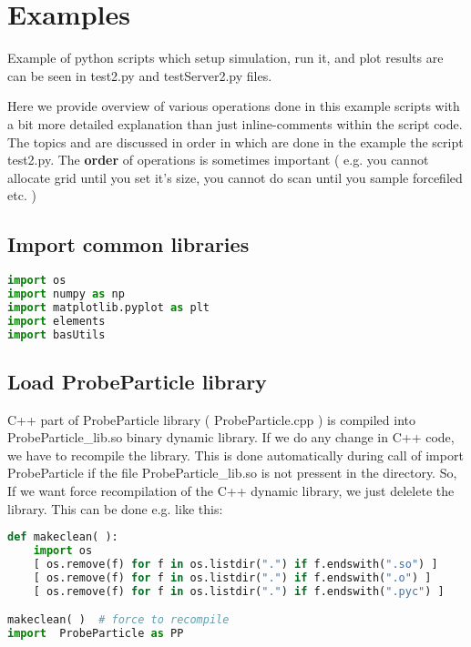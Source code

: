 \section{Examples}
Example of python scripts which setup simulation, run it, and plot results are
can be seen in test2.py and testServer2.py files.

Here we provide overview of various operations done in this example scripts with
a bit more detailed explanation than just inline-comments within the script
code. The topics and are discussed in order in which are done in the example the
script test2.py. The \textbf{order} of operations is sometimes important ( e.g. you
cannot allocate grid until you set it's size, you cannot do scan until you
sample forcefiled etc. )


\subsection{Import common libraries}

\begin{shadedbox}
    \begin{lstlisting}[language=python]
import os
import numpy as np
import matplotlib.pyplot as plt
import elements
import basUtils
    \end{lstlisting}
\end{shadedbox}




\subsection{Load ProbeParticle library}

C++ part of ProbeParticle library ( ProbeParticle.cpp ) is compiled into
ProbeParticle\_lib.so binary dynamic library. If we do any change in C++ code, we
have to recompile the library. This is done automatically during call of import
ProbeParticle if the file ProbeParticle\_lib.so is not pressent in the directory.
So, If we want force recompilation of the C++ dynamic library, we just delelete
the library. This can be done e.g. like this:


\begin{shadedbox}
    \begin{lstlisting}[language=python]
def makeclean( ):
    import os
    [ os.remove(f) for f in os.listdir(".") if f.endswith(".so") ]
    [ os.remove(f) for f in os.listdir(".") if f.endswith(".o") ]
    [ os.remove(f) for f in os.listdir(".") if f.endswith(".pyc") ]

makeclean( )  # force to recompile
import  ProbeParticle as PP

    \end{lstlisting}
\end{shadedbox}



